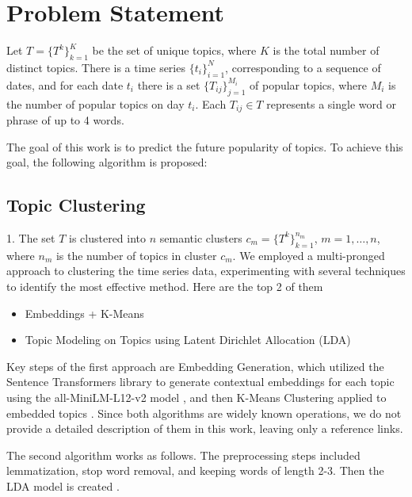 \section{Problem Statement}
Let $T = \{T^k\}_{k=1}^K$ be the set of unique topics, where $K$ is the total number of distinct topics. There is a time series $\{t_i\}_{i=1}^N$, corresponding to a sequence of dates, and for each date $t_i$ there is a set $\{T_{ij}\}_{j=1}^{M_i}$ of popular topics, where $M_i$ is the number of popular topics on day $t_i$. Each  $T_{ij} \in T$ represents a single word or phrase of up to 4 words.

The goal of this work is to predict the future popularity of topics. To achieve this goal, the following algorithm is proposed:

\subsection{Topic Clustering}

1. The set $T$  is clustered into $n$ semantic clusters  $c_m = \{T^k\}_{k=1}^{n_m}$, $m = 1, \ldots, n$, where  $n_m$  is the number of topics in cluster $c_m$. We employed a multi-pronged approach to clustering the time series data, experimenting with several techniques to identify the most effective method. Here are the top 2 of them

\begin{itemize}
\item Embeddings + K-Means
\item Topic Modeling on Topics using Latent Dirichlet Allocation (LDA)
\end{itemize}

Key steps of the first approach are Embedding Generation, which utilized the Sentence Transformers library \cite{Reimers2019} to generate contextual embeddings for each topic using the all-MiniLM-L12-v2 model \cite{SentenceTransformers}, and then K-Means Clustering applied to embedded topics \cite{sinaga2020unsupervised}. Since both algorithms are widely known operations, we do not provide a detailed description of them in this work, leaving only a reference links.

The second algorithm works as follows. The preprocessing steps included lemmatization, stop word removal, and keeping words of length 2-3. Then the LDA model is created \cite{blei2003latent}.

